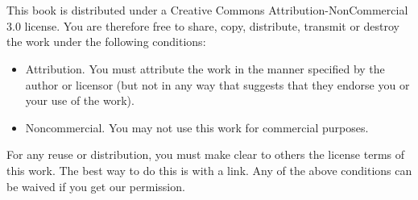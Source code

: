 
\chapter*{} %

This book is distributed under a Creative Commons Attribution-NonCommercial 3.0 license. You are therefore free to share, copy, distribute, transmit or destroy the work under the following conditions:
\begin{itemize}
 \item Attribution. You must attribute the work in the manner specified by the author or licensor (but not in any way that suggests that they endorse you or your use of the work).
 \item Noncommercial. You may not use this work for commercial purposes.
\end{itemize}

For any reuse or distribution, you must make clear to others the license terms of this work. The best way to do this is with a link.
Any of the above conditions can be waived if you get our permission.


%
%
